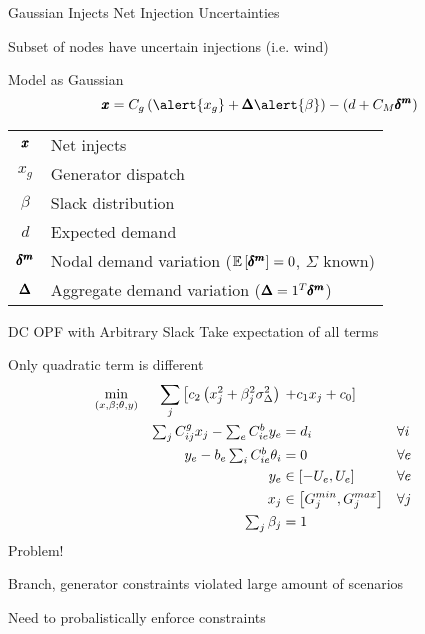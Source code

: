 \begin{frame}{Gaussian Injects}
\alert{Net Injection Uncertainties}
\bi
\item Subset of nodes have uncertain injections (i.e. wind)
\item Model as Gaussian
\ei
\pause
\begin{equation*}
 \rx = C_g\left(\alert{x_g}+\rD\alert{\beta}\right) - (d + C_M \ri) 
\end{equation*}

\pause
\begin{tabular}{ c l}
$\pmb{x}$ & Net injects \\
$x_g$ & Generator dispatch \\
$\beta$ & Slack distribution \\
$d$ & Expected demand \\
$\pmb{\delta^m}$ & Nodal demand variation ($\mathbb{E} \left[ \pmb{\delta^m} \right] = 0$, $\Sigma$ known)\\
$\pmb{\Delta}$ & Aggregate demand variation ($\pmb{\Delta} = 1^T \pmb{\delta^m}$)
\end{tabular}

\end{frame}


\begin{frame}{DC OPF with Arbitrary Slack}
Take expectation of all terms
\pause
\bi
\item Only quadratic term is different
\ei
\begin{alignat*}{3}
\min_{\left(x,\beta;\theta,y\right)} && \displaystyle\sum_j \left[  c_2 \left(x_j^2 + \beta_j^2 \sigma_\Delta^2 \right) \right. &\left.+ c_1 x_j + c_0 \right] &   \\
                        && \textstyle \sum_j C^g_{ij} x_j - \sum_e C^b_{ie} y_e          &=d_i       && \forall i \\ 
                 && y_e - b_e \textstyle \sum_i C^b_{ie} \theta_i          &=0         && \forall e \\
                 && y_e &\in \left[ -U_e, U_e \right] && \forall e \\
                 && x_j &\in \left[ G^{min}_j, G^{max}_j \right] && \forall j   \\
                 && \textstyle \sum_j \beta_j &=1 && 
\end{alignat*}
\pause
\alert{Problem!}
\bi
\item Branch, generator constraints violated large amount of scenarios
\item Need to probalistically enforce constraints
\ei
\end{frame}

